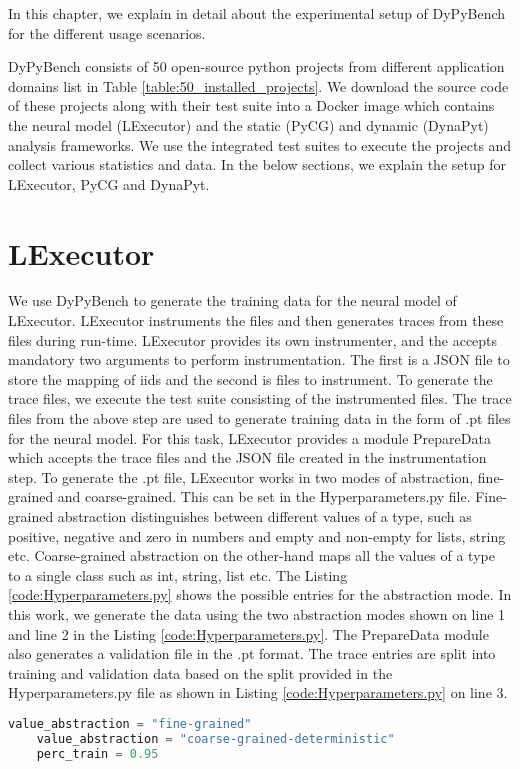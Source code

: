 In this chapter, we explain in detail about the experimental setup of DyPyBench for the different usage scenarios.

DyPyBench consists of 50 open-source python projects from different application domains list in Table \ref{table:50_installed_projects}.
We download the source code of these projects along with their test suite into a Docker image which contains the neural model (LExecutor) and the static (PyCG) and dynamic (DynaPyt) analysis frameworks.
We use the integrated test suites to execute the projects and collect various statistics and data.
In the below sections, we explain the setup for LExecutor, PyCG and DynaPyt.

\section{LExecutor}
We use DyPyBench to generate the training data for the neural model of LExecutor.
LExecutor instruments the files and then generates traces from these files during run-time.
LExecutor provides its own instrumenter, and the accepts mandatory two arguments to perform instrumentation.
The first is a JSON file to store the mapping of iids and the second is files to instrument.
To generate the trace files, we execute the test suite consisting of the instrumented files.
The trace files from the above step are used to generate training data in the form of .pt files for the neural model.
For this task, LExecutor provides a module PrepareData which accepts the trace files and the JSON file created in the instrumentation step.
To generate the .pt file, LExecutor works in two modes of abstraction, fine-grained and coarse-grained.
This can be set in the Hyperparameters.py file.
Fine-grained abstraction distinguishes between different values of a type, such as positive, negative and zero in numbers and empty and non-empty for lists, string etc.
Coarse-grained abstraction on the other-hand maps all the values of a type to a single class such as int, string, list etc. \cite{LExecutor_2023}
The Listing \ref{code:Hyperparameters.py} shows the possible entries for the abstraction mode.
In this work, we generate the data using the two abstraction modes shown on line 1 and line 2 in the Listing \ref{code:Hyperparameters.py}. 
The PrepareData module also generates a validation file in the .pt format.
The trace entries are split into training and validation data based on the split provided in the Hyperparameters.py file as shown in Listing \ref{code:Hyperparameters.py} on line 3.
\begin{lstlisting}[caption=Abstraction Modes in LExecutor,label=code:Hyperparameters.py,language=Python]
    value_abstraction = "fine-grained"
    value_abstraction = "coarse-grained-deterministic"
    perc_train = 0.95
\end{lstlisting}

